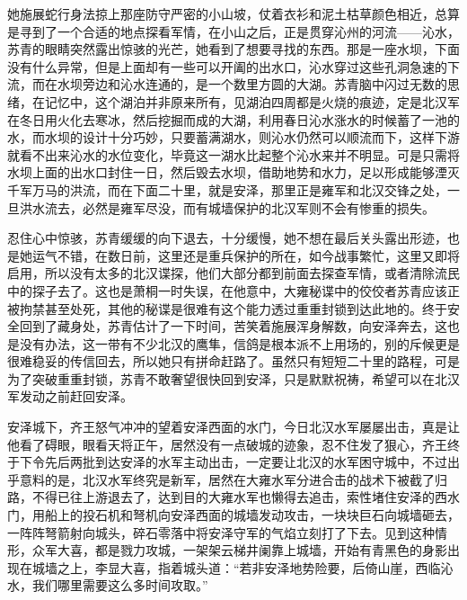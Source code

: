 她施展蛇行身法掠上那座防守严密的小山坡，仗着衣衫和泥土枯草颜色相近，总算是寻到了一个合适的地点探看军情，在小山之后，正是贯穿沁州的河流——沁水，苏青的眼睛突然露出惊骇的光芒，她看到了想要寻找的东西。那是一座水坝，下面没有什么异常，但是上面却有一些可以开阖的出水口，沁水穿过这些孔洞急速的下流，而在水坝旁边和沁水连通的，是一个数里方圆的大湖。苏青脑中闪过无数的思绪，在记忆中，这个湖泊并非原来所有，见湖泊四周都是火烧的痕迹，定是北汉军在冬日用火化去寒冰，然后挖掘而成的大湖，利用春日沁水涨水的时候蓄了一池的水，而水坝的设计十分巧妙，只要蓄满湖水，则沁水仍然可以顺流而下，这样下游就看不出来沁水的水位变化，毕竟这一湖水比起整个沁水来并不明显。可是只需将水坝上面的出水口封住一日，然后毁去水坝，借助地势和水力，足以形成能够湮灭千军万马的洪流，而在下面二十里，就是安泽，那里正是雍军和北汉交锋之处，一旦洪水流去，必然是雍军尽没，而有城墙保护的北汉军则不会有惨重的损失。

忍住心中惊骇，苏青缓缓的向下退去，十分缓慢，她不想在最后关头露出形迹，也是她运气不错，在数日前，这里还是重兵保护的所在，如今战事繁忙，这里又即将启用，所以没有太多的北汉谍探，他们大部分都到前面去探查军情，或者清除流民中的探子去了。这也是萧桐一时失误，在他意中，大雍秘谍中的佼佼者苏青应该正被拘禁甚至处死，其他的秘谍是很难有这个能力透过重重封锁到达此地的。终于安全回到了藏身处，苏青估计了一下时间，苦笑着施展浑身解数，向安泽奔去，这也是没有办法，这一带有不少北汉的鹰隼，信鸽是根本派不上用场的，别的斥候更是很难稳妥的传信回去，所以她只有拼命赶路了。虽然只有短短二十里的路程，可是为了突破重重封锁，苏青不敢奢望很快回到安泽，只是默默祝祷，希望可以在北汉军发动之前赶回安泽。

安泽城下，齐王怒气冲冲的望着安泽西面的水门，今日北汉水军屡屡出击，真是让他看了碍眼，眼看天将正午，居然没有一点破城的迹象，忍不住发了狠心，齐王终于下令先后两批到达安泽的水军主动出击，一定要让北汉的水军困守城中，不过出乎意料的是，北汉水军终究是新军，居然在大雍水军分进合击的战术下被截了归路，不得已往上游退去了，达到目的大雍水军也懒得去追击，索性堵住安泽的西水门，用船上的投石机和弩机向安泽西面的城墙发动攻击，一块块巨石向城墙砸去，一阵阵弩箭射向城头，碎石零落中将安泽守军的气焰立刻打了下去。见到这种情形，众军大喜，都是戮力攻城，一架架云梯井阑靠上城墙，开始有青黑色的身影出现在城墙之上，李显大喜，指着城头道：“若非安泽地势险要，后倚山崖，西临沁水，我们哪里需要这么多时间攻取。”

